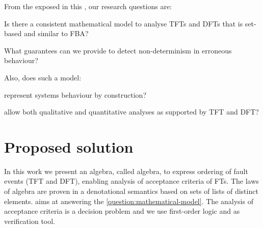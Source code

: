 From the exposed in this , our research questions are:
\begin{rqenum}[series=researchquestion]
  \item Is there a consistent mathematical model to analyse \acp{TFT} and \acp{DFT} that is set-based and similar to \ac{FBA}?\label{question:mathematical-model}
  \item What guarantees can we provide to detect non-determinism in erroneous behaviour?\label{question:non-determinism}
\end{rqenum}
%
Also, does such a model:
%
\begin{rqenum}[resume*=researchquestion]
  \item represent systems behaviour by construction\label{question:gap}?
  \item allow both qualitative and quantitative analyses as supported by \ac{TFT} and \ac{DFT}\label{question:analyses}?
\end{rqenum}

%

\section{Proposed solution}

In this work we present an algebra, called \acf{algebra}, to express ordering of fault events (\ac{TFT} and \ac{DFT}), enabling analysis of	 acceptance criteria of \acp{FT}.
The laws of \ac{algebra} are proven in a denotational semantics based on sets of lists of distinct elements.
 aims at answering the \cref{question:mathematical-model}.
The analysis of acceptance criteria is a decision problem and we use first-order logic and \isabellehol as verification tool.

